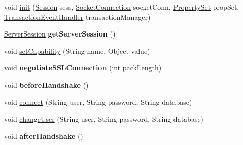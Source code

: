 \begin{DoxyCompactItemize}
\item 
void \mbox{\hyperlink{classcom_1_1mysql_1_1cj_1_1protocol_1_1x_1_1_x_protocol_a4007f4bf0c11af18162121e030183839}{init}} (\mbox{\hyperlink{interfacecom_1_1mysql_1_1cj_1_1_session}{Session}} sess, \mbox{\hyperlink{interfacecom_1_1mysql_1_1cj_1_1protocol_1_1_socket_connection}{Socket\+Connection}} socket\+Conn, \mbox{\hyperlink{interfacecom_1_1mysql_1_1cj_1_1conf_1_1_property_set}{Property\+Set}} prop\+Set, \mbox{\hyperlink{interfacecom_1_1mysql_1_1cj_1_1_transaction_event_handler}{Transaction\+Event\+Handler}} transaction\+Manager)
\item 
\mbox{\label{classcom_1_1mysql_1_1cj_1_1protocol_1_1x_1_1_x_protocol_a856b079958623feb6f650c796082839e}} 
\mbox{\hyperlink{interfacecom_1_1mysql_1_1cj_1_1protocol_1_1_server_session}{Server\+Session}} {\bfseries get\+Server\+Session} ()
\item 
void \mbox{\hyperlink{classcom_1_1mysql_1_1cj_1_1protocol_1_1x_1_1_x_protocol_a4c3435d8052e1759f91e14ae41137e02}{set\+Capability}} (String name, Object value)
\item 
\mbox{\label{classcom_1_1mysql_1_1cj_1_1protocol_1_1x_1_1_x_protocol_ae1b4af5ef2c1ef4f6b9edc74095ea43c}} 
void {\bfseries negotiate\+S\+S\+L\+Connection} (int pack\+Length)
\item 
\mbox{\label{classcom_1_1mysql_1_1cj_1_1protocol_1_1x_1_1_x_protocol_a179c06c40d9fa5e7e30d79d9f96961a1}} 
void {\bfseries before\+Handshake} ()
\item 
void \mbox{\hyperlink{classcom_1_1mysql_1_1cj_1_1protocol_1_1x_1_1_x_protocol_ad9932aa9ac2484e47e8a4d34e3a8d691}{connect}} (String user, String password, String database)
\item 
void \mbox{\hyperlink{classcom_1_1mysql_1_1cj_1_1protocol_1_1x_1_1_x_protocol_ada78c49db272f6f4a680c7d552f5be86}{change\+User}} (String user, String password, String database)
\item 
\mbox{\label{classcom_1_1mysql_1_1cj_1_1protocol_1_1x_1_1_x_protocol_aef11da33d3a3b55663631eab148e8018}} 
void {\bfseries after\+Handshake} ()
\item 

\end{DoxyCompactItemize}
